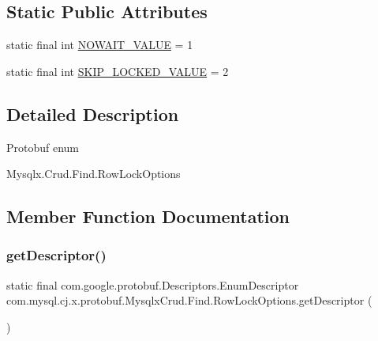 \subsection*{Static Public Attributes}
\begin{DoxyCompactItemize}
\item 
static final int \mbox{\hyperlink{enumcom_1_1mysql_1_1cj_1_1x_1_1protobuf_1_1_mysqlx_crud_1_1_find_1_1_row_lock_options_a14ebc10d0029275b1275e94082e4e018}{N\+O\+W\+A\+I\+T\+\_\+\+V\+A\+L\+UE}} = 1
\item 
static final int \mbox{\hyperlink{enumcom_1_1mysql_1_1cj_1_1x_1_1protobuf_1_1_mysqlx_crud_1_1_find_1_1_row_lock_options_acdab3701d93fa0c87ffa68bf407ecd12}{S\+K\+I\+P\+\_\+\+L\+O\+C\+K\+E\+D\+\_\+\+V\+A\+L\+UE}} = 2
\end{DoxyCompactItemize}


\subsection{Detailed Description}
Protobuf enum
\begin{DoxyCode}
Mysqlx.Crud.Find.RowLockOptions 
\end{DoxyCode}
 

\subsection{Member Function Documentation}
\mbox{\label{enumcom_1_1mysql_1_1cj_1_1x_1_1protobuf_1_1_mysqlx_crud_1_1_find_1_1_row_lock_options_a4d583191b8a98a95e82d3e56dd61144c}} 
\subsubsection{\texorpdfstring{get\+Descriptor()}{getDescriptor()}}
{\footnotesize\ttfamily static final com.\+google.\+protobuf.\+Descriptors.\+Enum\+Descriptor com.\+mysql.\+cj.\+x.\+protobuf.\+Mysqlx\+Crud.\+Find.\+Row\+Lock\+Options.\+get\+Descriptor (\begin{DoxyParamCaption}{ }\end{DoxyParamCaption})\hspace{0.3cm}{\ttfamily [static]}}

